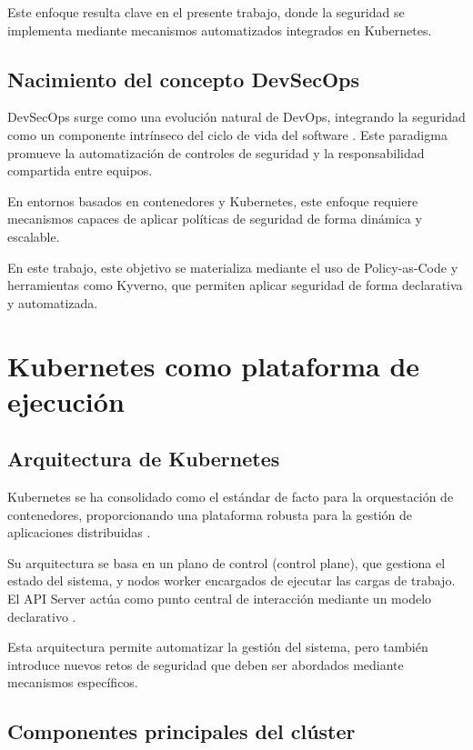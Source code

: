 Este enfoque resulta clave en el presente trabajo, donde la seguridad se implementa mediante mecanismos automatizados integrados en Kubernetes.

\subsection{Nacimiento del concepto DevSecOps}

DevSecOps surge como una evolución natural de DevOps, integrando la seguridad como un componente intrínseco del ciclo de vida del software \cite{mohan2016towards}. Este paradigma promueve la automatización de controles de seguridad y la responsabilidad compartida entre equipos.

En entornos basados en contenedores y Kubernetes, este enfoque requiere mecanismos capaces de aplicar políticas de seguridad de forma dinámica y escalable.

En este trabajo, este objetivo se materializa mediante el uso de Policy-as-Code y herramientas como Kyverno, que permiten aplicar seguridad de forma declarativa y automatizada.

\section{Kubernetes como plataforma de ejecución}

\subsection{Arquitectura de Kubernetes}

Kubernetes se ha consolidado como el estándar de facto para la orquestación de contenedores, proporcionando una plataforma robusta para la gestión de aplicaciones distribuidas \cite{burns2016borg}.

Su arquitectura se basa en un plano de control (control plane), que gestiona el estado del sistema, y nodos worker encargados de ejecutar las cargas de trabajo. El API Server actúa como punto central de interacción mediante un modelo declarativo \cite{kubernetes_docs}.

Esta arquitectura permite automatizar la gestión del sistema, pero también introduce nuevos retos de seguridad que deben ser abordados mediante mecanismos específicos.

\subsection{Componentes principales del clúster}

